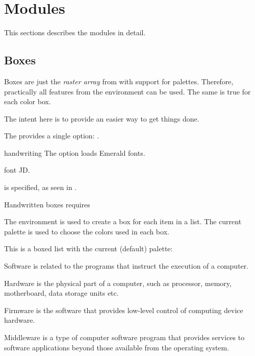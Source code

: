 \documentclass[a4paper, 11pt]{article}
\begin{document}
\section{Modules}

This sections describes the modules in detail.

\subsection{Boxes}\label{sec:boxes}

Boxes are just the \textit{raster array} from  with support for palettes. Therefore, practically all features from the  environment can be used. The same is true for each color box.

The intent here is to provide an easier way to get things done.

The  provides a single option: .

\begin{option}{handwriting}{}
    The option  loads Emerald fonts.

    font JD\footnotemark.

    is specified, as seen in .

    Handwritten boxes requires
\end{option}

The environment  is used to create a box for each item in a list. The current palette is used to choose the colors used in each box.

\begin{example}{}
    This is a boxed list with the current (default) palette:

    \begin{PLTBoxRaster}[enumerate]
        \item Software is related to the programs that instruct the execution of a computer.
        \item Hardware is the physical part of a computer, such as processor, memory, motherboard, data storage units etc.
        \item Firmware is the software that provides low-level control of computing device hardware.
        \item Middleware is a type of computer software program that provides services to software applications beyond those available from the operating system.
    \end{PLTBoxRaster}
\end{example}
\end{document}
